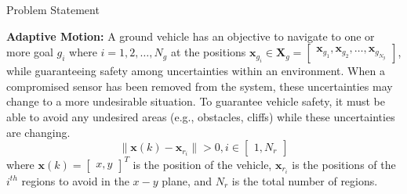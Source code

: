 \begin{section}{Problem Statement}
\begin{problem} \label{problem2} {\textbf{Adaptive Motion:}} 
A ground vehicle has an objective to navigate to one or more goal $g_i$ where $i=1,2,\dots,N_g$ at the positions $\bm{x}_{g_i} \in \bm{X}_g =  \begin{bmatrix} \bm{x}_{g_1},\bm{x}_{g_2},\dots,\bm{x}_{g_{N_g}} \end{bmatrix}$, while guaranteeing safety among uncertainties within an environment. When a compromised sensor has been removed from the system, these uncertainties may change to a more undesirable situation. To guarantee vehicle safety, it must be able to avoid any undesired areas (e.g., obstacles, cliffs) while these uncertainties are changing.
	\begin{equation}
		\lVert {\bm{x}(k)-\bm{x}_{r_i}} \rVert >0,  i \in \begin{bmatrix} 1,N_r \end{bmatrix}
	\end{equation}
where $\bm{x}(k)={\begin{bmatrix} x,y \end{bmatrix}}^T$ is the position of the vehicle, $\bm{x}_{r_i}$ is the positions of the ${i}^{th}$ regions to avoid in the $x-y$ plane, and $N_r$ is the total number of regions.





\end{problem}
\end{section}
